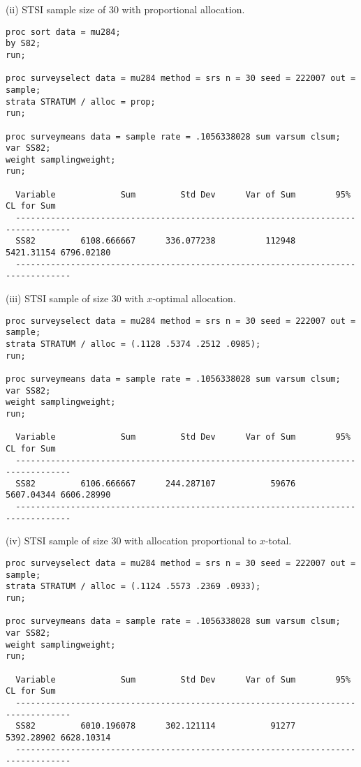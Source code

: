 \documentclass[12pt]{article}
\begin{document}
(ii) STSI sample size of 30 with proportional allocation.

\begin{verbatim}
proc sort data = mu284;
by S82;
run;

proc surveyselect data = mu284 method = srs n = 30 seed = 222007 out = sample;
strata STRATUM / alloc = prop;
run;

proc surveymeans data = sample rate = .1056338028 sum varsum clsum;
var SS82;
weight samplingweight;
run;

  Variable             Sum         Std Dev      Var of Sum        95% CL for Sum
  ---------------------------------------------------------------------------------
  SS82         6108.666667      336.077238          112948    5421.31154 6796.02180
  ---------------------------------------------------------------------------------
\end{verbatim}


(iii) STSI sample of size 30 with $x$-optimal allocation.

\begin{verbatim}
proc surveyselect data = mu284 method = srs n = 30 seed = 222007 out = sample;
strata STRATUM / alloc = (.1128 .5374 .2512 .0985);
run;

proc surveymeans data = sample rate = .1056338028 sum varsum clsum;
var SS82;
weight samplingweight;
run;

  Variable             Sum         Std Dev      Var of Sum        95% CL for Sum
  ---------------------------------------------------------------------------------
  SS82         6106.666667      244.287107           59676    5607.04344 6606.28990
  ---------------------------------------------------------------------------------
\end{verbatim}

(iv) STSI sample of size 30 with allocation proportional to $x$-total.

\begin{verbatim}
proc surveyselect data = mu284 method = srs n = 30 seed = 222007 out = sample;
strata STRATUM / alloc = (.1124 .5573 .2369 .0933);
run;

proc surveymeans data = sample rate = .1056338028 sum varsum clsum;
var SS82;
weight samplingweight;
run;

  Variable             Sum         Std Dev      Var of Sum        95% CL for Sum
  ---------------------------------------------------------------------------------
  SS82         6010.196078      302.121114           91277    5392.28902 6628.10314
  ---------------------------------------------------------------------------------
\end{verbatim}
\end{document}
